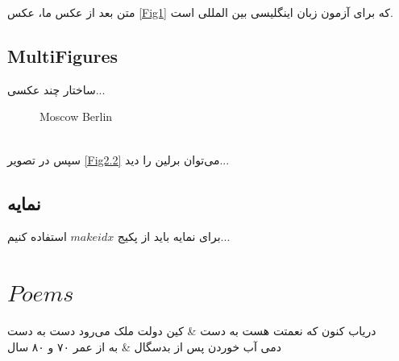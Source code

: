 \documentclass{book}
\begin{document}
متن بعد از عکس ما، عکس \ref{Fig1}
که برای آزمون زبان اینگلیسی بین المللی است.
\vspace*{3cm}

\section{MultiFigures}
ساختار چند عکسی...
\begin{figure}[h!]
	\begin{center}
	\hspace*{1cm}
	\end{center}
	\caption{ Moscow  Berlin}
\end{figure}
\\
سپس در تصویر \ref{Fig2.2}
می‌توان برلین را دید...
\section{نمایه}
برای نمایه باید از پکیج $ makeidx$
استفاده کنیم...
\chapter{$Poems$}

\begin{traditionalpoem}
	دریاب کنون که نعمتت هست به دست & 
	کین دولت ملک می‌رود دست به دست \\
	دمی آب خوردن پس از بدسگال &
	به از عمر ۷۰ و ۸۰ سال \\
\end{traditionalpoem}
\end{document}
